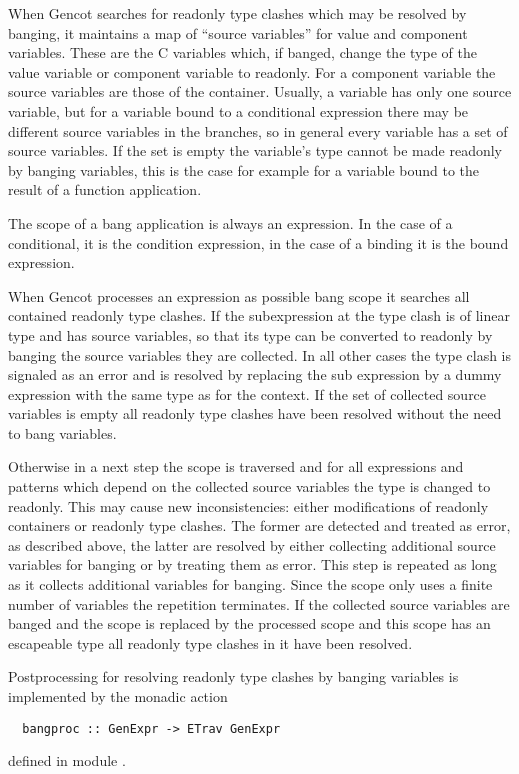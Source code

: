 When Gencot searches for readonly type clashes which may be resolved by banging, it maintains a map of ``source variables'' for
value and component variables. These are the C variables which, if banged, change the type of the value variable or component
variable to readonly. For a component variable the source variables are those of the container. Usually, a variable has only
one source variable, but for a variable bound to a conditional expression there may be different source variables in the branches,
so in general every variable has a set of source variables. If the set is empty the variable's type cannot be made readonly
by banging variables, this is the case for example for a variable bound to the result of a function application.

The scope of a bang application is always an expression. In the case of a conditional, it is the condition expression, in the
case of a binding it is the bound expression.

When Gencot processes an expression as possible bang scope it searches all
contained readonly type clashes. If the subexpression at the type clash is of linear type and has source variables, so that
its type can be converted to readonly by banging the source variables they are collected. In all other cases the type clash
is signaled as an error and is resolved by replacing the sub expression by a dummy expression with the same type as for the
context. If the set of collected source variables is empty all readonly type clashes have been resolved without the need to
bang variables.

Otherwise in a next step the scope is traversed and for all expressions and patterns which depend on the collected source
variables the type is changed to readonly. This may cause new inconsistencies: either modifications of readonly containers
or readonly type clashes. The former are detected and treated as error, as described above, the latter are resolved by either
collecting additional source variables for banging or by treating them as error. This step is repeated as long as it collects
additional variables for banging. Since the scope only uses a finite number of variables the repetition terminates. If the
collected source variables are banged and the scope is replaced by the processed scope and this scope has an escapeable type
all readonly type clashes in it have been resolved.

Postprocessing for resolving readonly type clashes by banging variables is implemented by the monadic action
\begin{verbatim}
  bangproc :: GenExpr -> ETrav GenExpr
\end{verbatim}
defined in module .

